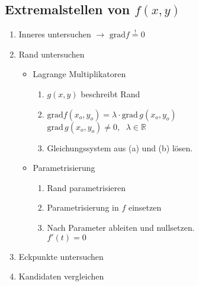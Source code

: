 \subsection{Extremalstellen von \texorpdfstring{$f(x,y)$}{f(x,y)}}
    \vspace{0.25em}
    \begin{enumerate}
        \item Inneres untersuchen $\to$ $\textrm{grad}f \overset{!}{=} 0$
        \item Rand untersuchen
        \begin{itemize}
            \item Lagrange Multiplikatoren
            \begin{enumerate}
                \item $g(x,y)$ beschreibt Rand
                \item $\textrm{grad}f(x_o,y_o) = \lambda \cdot \textrm{grad}\, g(x_o,y_o)$\\[0.25em]
                      \phantom{llll}$\textrm{grad}\, g(x_o,y_o) \neq 0,\phantom{ll} \lambda \in \mathbb{R}$
                \item Gleichungssystem aus (a) und (b) lösen.
            \end{enumerate}
            \item Parametrisierung
            \begin{enumerate}
                \item Rand parametrisieren
                \item Parametrisierung in $f$ einsetzen
                \item Nach Parameter ableiten und nullsetzen.\\[0.25em] \phantom{llll}$f'(t) = 0$
            \end{enumerate}
        \end{itemize}
        \item Eckpunkte untersuchen
        \item Kandidaten vergleichen
    \end{enumerate}